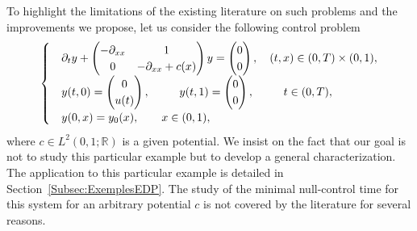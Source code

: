 \documentclass[11pt]{article}
\theoremstyle{definition}
\numberwithin{equation}{section}
\numberwithin{figure}{section}
\numberwithin{table}{section}
\newcommand{\R}{\mathbb{R}}
\begin{document}
To highlight the limitations of the existing literature on such problems and the improvements we propose, let us consider the following control problem
\begin{equation*}
\begin{cases}
& \partial_t y +
\begin{pmatrix} - \partial_{xx} & 1 \\ 0 & -\partial_{xx} + c(x)
\end{pmatrix} y =
\begin{pmatrix} 0 \\ 0
\end{pmatrix},
\quad (t,x) \in (0,T) \times (0,1),
\\
&y(t,0) =
\begin{pmatrix}
0 \\ u(t)
\end{pmatrix}, \mkern47mu y(t,1) =
\begin{pmatrix}
0 \\ 0
\end{pmatrix}, \quad \mkern 29mu t\in (0,T),
\\
&y(0,x) = y_0(x), \qquad x \in (0,1),
\end{cases}
\end{equation*}
where $c\in L^2(0,1;\R)$ is a given potential. We insist on the fact that our goal is not to study this particular example but to develop a general characterization. The application to this particular example is detailed in Section~\ref{Subsec:ExemplesEDP}. The study of the minimal null-control time for this system for an arbitrary potential $c$ is not covered by the literature for several reasons.
\end{document}
